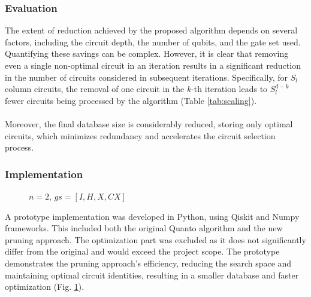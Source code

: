 \subsubsection{Evaluation}
The extent of reduction achieved by the proposed algorithm depends on several factors, including the circuit depth, the number of qubits, and the gate set used. Quantifying these savings can be complex. However, it is clear that removing even a single non-optimal circuit in an iteration results in a significant reduction in the number of circuits considered in subsequent iterations. Specifically, for $S_l$ column circuits, the removal of one circuit in the $k$-th iteration leads to $S_l^{d-k}$ fewer circuits being processed by the algorithm (Table \ref{tab:scaling}).
\\\\
Moreover, the final database size is considerably reduced, storing only optimal circuits, which minimizes redundancy and accelerates the circuit selection process.

\subsubsection{Implementation}
\begin{figure}
  \caption{$n = 2$, $gs=[I,H,X,CX]$}
  \label{fig:comp}
\end{figure}
A prototype implementation was developed in Python, using Qiskit and Numpy \cite{numpy} frameworks. This included both the original Quanto algorithm and the new pruning approach. The optimization part was excluded as it does not significantly differ from the original and would exceed the project scope. The prototype demonstrates the pruning approach's efficiency, reducing the search space and maintaining optimal circuit identities, resulting in a smaller database and faster optimization (Fig. \ref{fig:comp}).

